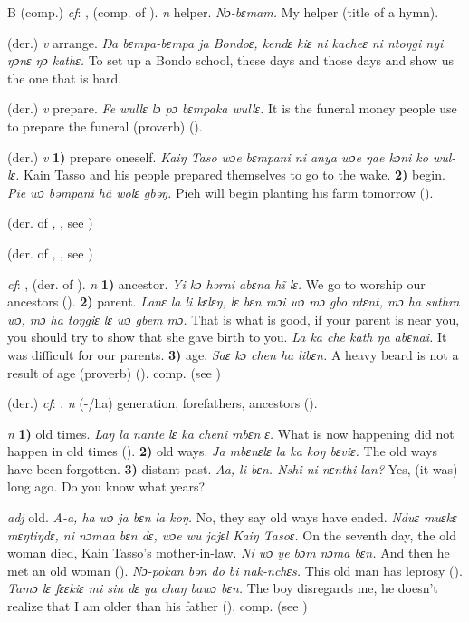 \begin{letter}{B}
 (comp.) \textit{cf}: ,  (comp. of ). \textit{n} helper. \textit{Nɔ-bɛmam.} My helper (title of a hymn).

 (der.) \textit{v} arrange. \textit{Ŋa bɛmpa-bɛmpa ja Bondoɛ, kendɛ kiɛ ni kacheɛ ni ntoŋgi nyi ŋɔnɛ ŋɔ kathɛ.} To set up a Bondo school, these days and those days and show us the one that is hard.

 (der.) \textit{v} prepare. \textit{Fe wullɛ lɔ pɔ bɛmpaka wullɛ.} It is the funeral money people use to prepare the funeral (proverb) (\citealt{TISLL1979}).

 (der.) \textit{v} \textbf{1)} prepare oneself. \textit{Kaiŋ Taso wɔe bɛmpani ni anya wɔe ŋae kɔni ko wul-lɛ.} Kain Tasso and his people prepared themselves to go to the wake. \textbf{2)} begin. \textit{Pie wɔ bəmpani hã wolɛ gbəŋ.} Pieh will begin planting his farm tomorrow (\citealt{Pichl1967}). 

 (der. of , , see ) 

 (der. of , , see ) 

 \textit{cf}: ,  (der. of ). \textit{n} \textbf{1)} ancestor. \textit{Yi kɔ hərni abɛna hĩ lɛ.} We go to worship our ancestors (\citealt{Pichl1967}). \textbf{2)} parent. \textit{Lanɛ la li kɛlɛŋ, lɛ bɛn mɔi wɔ mɔ gbo ntɛnt, mɔ ha suthra wɔ, mɔ ha toŋgiɛ lɛ wɔ gbem mɔ.} That is what is good, if your parent is near you, you should try to show that she gave birth to you. \textit{La ka che kath ŋa abɛnai.} It was difficult for our parents. \textbf{3)} age. \textit{Saɛ kɔ chen ha libɛn.} A heavy beard is not a result of age (proverb) (\citealt{TISLL1979}). comp.  (see ) 

 (der.) \textit{cf}: . \textit{n} (-/ha) generation, forefathers, ancestors (\citealt{Pichl1967}). 

 \textit{n} \textbf{1)} old times. \textit{Laŋ la nante lɛ ka cheni mbɛn ɛ.} What is now happening did not happen in old times (\citealt{Pichl1967}). \textbf{2)} old ways. \textit{Ja mbɛnɛlɛ la ka koŋ bɛviɛ.} The old ways have been forgotten. \textbf{3)} distant past. \textit{Aa, li bɛn. Nshi ni nɛnthi lan?} Yes, (it was) long ago. Do you know what years?

 \textit{adj} old. \textit{A-a, ha wɔ ja bɛn la koŋ.} No, they say old ways have ended. \textit{Nduɛ muɛkɛ mɛŋtiŋdɛ, ni nɔmaa bɛn dɛ, wɔe wu jajɛl Kaiŋ Tasoɛ.}
On the seventh day, the old woman died, Kain Tasso’s mother-in-law. \textit{Ni wɔ ye bɔm nɔma bɛn.} And then he met an old woman (\citealt{Pichl1967}). \textit{Nɔ-pokan bən do bi nak-nchɛs.} This old man has leprosy (\citealt{Pichl1967}). \textit{Tamɔ lɛ fɛɛkiɛ mi sin dɛ ya chaŋ bawɔ bɛn.} The boy disregards me, he doesn't realize that I am older than his father (\citealt{Pichl1967}). comp.  (see ) 


\end{letter}
